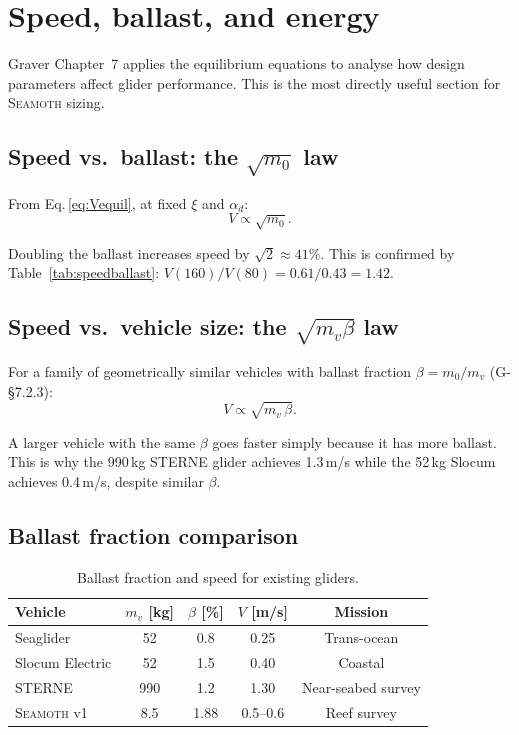 \documentclass[11pt,a4paper]{article}
\newcommand{\seamoth}{\textsc{Seamoth}}
\begin{document}
\section{Speed, ballast, and energy}
\label{sec:design}

Graver Chapter~7 applies the equilibrium equations to analyse how design parameters
affect glider performance.  This is the most directly useful section for \seamoth{}
sizing.

\subsection{Speed vs.\ ballast: the $\sqrt{m_0}$ law}

From Eq.\,\eqref{eq:Vequil}, at fixed $\xi$ and $\alpha_d$:
\begin{equation}
  V \propto \sqrt{m_0}.
  \label{eq:Vsqrt}
\end{equation}

Doubling the ballast increases speed by $\sqrt{2}\approx41\%$.  This is confirmed
by Table~\ref{tab:speedballast}: $V(160)/V(80) = 0.61/0.43 = 1.42$.

\subsection{Speed vs.\ vehicle size: the $\sqrt{m_v\beta}$ law}

For a family of geometrically similar vehicles with ballast fraction $\beta=m_0/m_v$
(G-\S7.2.3):
\begin{equation}
  V \propto \sqrt{m_v\,\beta}.
  \label{eq:Vscale}
\end{equation}

A larger vehicle with the same $\beta$ goes faster simply because it has more ballast.
This is why the 990\,kg STERNE glider achieves 1.3\,m/s while the 52\,kg Slocum achieves
0.4\,m/s, despite similar $\beta$.

\subsection{Ballast fraction comparison}

\begin{table}[H]
\centering
\caption{Ballast fraction and speed for existing gliders.}
\begin{tabular}{@{}l c c c c@{}}
\toprule
Vehicle & $m_v$ [kg] & $\beta$ [\%] & $V$ [m/s] & Mission \\
\midrule
Seaglider & 52 & 0.8 & 0.25 & Trans-ocean \\
Slocum Electric & 52 & 1.5 & 0.40 & Coastal \\
STERNE & 990 & 1.2 & 1.30 & Near-seabed survey \\
\seamoth{} v1 & 8.5 & 1.88 & 0.5--0.6 & Reef survey \\
\bottomrule
\end{tabular}
\end{table}
\end{document}
